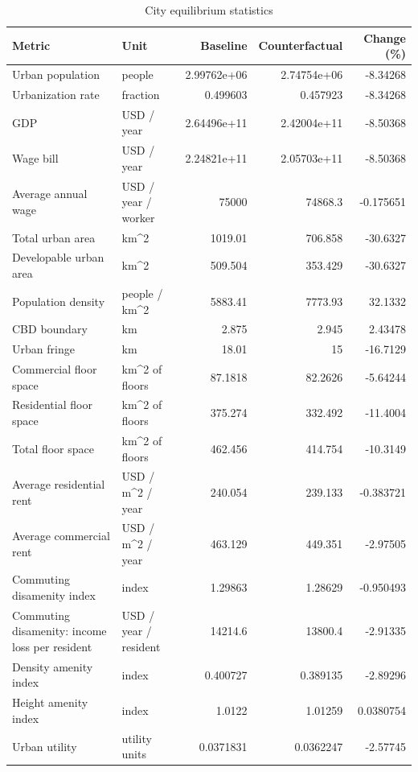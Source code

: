 \begin{table}[htbp]
\centering
\caption{City equilibrium statistics}
\small
\begin{tabular}{p{3.9cm}p{2.7cm}rrr}
\toprule
Metric & Unit & Baseline & Counterfactual & Change (\%) \\
\midrule
Urban population & people & 2.99762e+06 & 2.74754e+06 & -8.34268 \\
Urbanization rate & fraction & 0.499603 & 0.457923 & -8.34268 \\
GDP & USD / year & 2.64496e+11 & 2.42004e+11 & -8.50368 \\
Wage bill & USD / year & 2.24821e+11 & 2.05703e+11 & -8.50368 \\
Average annual wage & USD / year / worker & 75000 & 74868.3 & -0.175651 \\
Total urban area & km\textasciicircum{}2 & 1019.01 & 706.858 & -30.6327 \\
Developable urban area & km\textasciicircum{}2 & 509.504 & 353.429 & -30.6327 \\
Population density & people / km\textasciicircum{}2 & 5883.41 & 7773.93 & 32.1332 \\
CBD boundary & km & 2.875 & 2.945 & 2.43478 \\
Urban fringe & km & 18.01 & 15 & -16.7129 \\
Commercial floor space & km\textasciicircum{}2 of floors & 87.1818 & 82.2626 & -5.64244 \\
Residential floor space & km\textasciicircum{}2 of floors & 375.274 & 332.492 & -11.4004 \\
Total floor space & km\textasciicircum{}2 of floors & 462.456 & 414.754 & -10.3149 \\
Average residential rent & USD / m\textasciicircum{}2 / year & 240.054 & 239.133 & -0.383721 \\
Average commercial rent & USD / m\textasciicircum{}2 / year & 463.129 & 449.351 & -2.97505 \\
Commuting disamenity index & index & 1.29863 & 1.28629 & -0.950493 \\
Commuting disamenity: income loss per resident & USD / year / resident & 14214.6 & 13800.4 & -2.91335 \\
Density amenity index & index & 0.400727 & 0.389135 & -2.89296 \\
Height amenity index & index & 1.0122 & 1.01259 & 0.0380754 \\
Urban utility & utility units & 0.0371831 & 0.0362247 & -2.57745 \\

\end{tabular}
\end{table}

